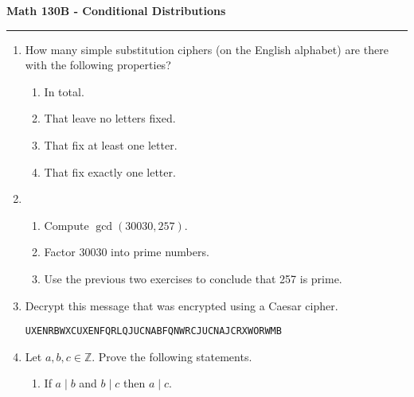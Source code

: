 \documentclass[11pt,letterpaper]{article}
\newcommand{\integers}{\mathbb{Z}}
\begin{document}
\begin{center}
{\bf \Large Math 130B - Conditional Distributions}
\vspace{0.2cm}
\hrule
\end{center}

\begin{enumerate}

    \item How many simple substitution ciphers (on the English alphabet) are there with the following properties?
    \begin{enumerate}
        \item In total.
        \vfill

        \item That leave no letters fixed.

        \vfill

        \item That fix at least one letter.

        \vfill

        \item That fix exactly one letter.

    \end{enumerate}
    \vfill

    \item \begin{enumerate}
        \item Compute $\gcd(30030, 257)$.

        \vfill

        \item Factor $30030$ into prime numbers.

        \vfill

        \item Use the previous two exercises to conclude that 257 is prime.
    \end{enumerate}

    \vfill\pagebreak

    \item Decrypt this message that was encrypted using a Caesar cipher.
    \begin{center}
        \texttt{UXENRBWXCUXENFQRLQJUCNABFQNWRCJUCNAJCRXWORWMB}
    \end{center}

    \vfill

    \item Let $a, b, c\in \integers$. Prove the following statements.
    \begin{enumerate}
        \item If $a\mid b$ and $b\mid c$ then $a\mid c$.
        \vfill


\end{enumerate}
\end{enumerate}
\end{document}
